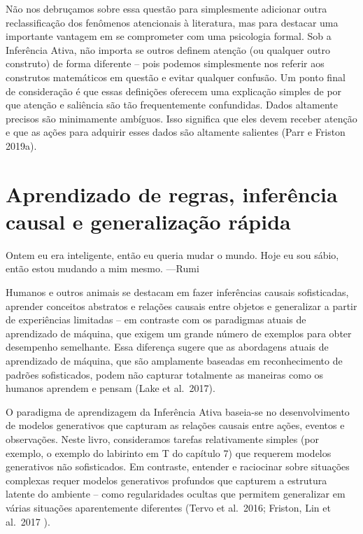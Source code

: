 \documentclass[
  12pt,
]{book}
\begin{document}
Não nos debruçamos sobre essa questão para simplesmente adicionar outra reclassificação dos fenômenos atencionais à literatura, mas para destacar uma importante vantagem em se comprometer com uma psicologia formal. Sob a Inferência Ativa, não importa se outros definem atenção (ou qualquer outro construto) de forma diferente -- pois podemos simplesmente nos referir aos construtos matemáticos em questão e evitar qualquer confusão. Um ponto final de consideração é que essas definições oferecem uma explicação simples de por que atenção e saliência são tão frequentemente confundidas. Dados altamente precisos são minimamente ambíguos. Isso significa que eles devem receber atenção e que as ações para adquirir esses dados são altamente salientes (Parr e Friston 2019a).

\hypertarget{aprendizado-de-regras-inferuxeancia-causal-e-generalizauxe7uxe3o-ruxe1pida}{%
\section{Aprendizado de regras, inferência causal e generalização rápida}\label{aprendizado-de-regras-inferuxeancia-causal-e-generalizauxe7uxe3o-ruxe1pida}}

Ontem eu era inteligente, então eu queria mudar o mundo. Hoje eu sou sábio, então estou mudando a mim mesmo.
---Rumi

Humanos e outros animais se destacam em fazer inferências causais sofisticadas, aprender conceitos abstratos e relações causais entre objetos e generalizar a partir de experiências limitadas -- em contraste com os paradigmas atuais de aprendizado de máquina, que exigem um grande número de exemplos para obter desempenho semelhante. Essa diferença sugere que as abordagens atuais de aprendizado de máquina, que são amplamente baseadas em reconhecimento de padrões sofisticados, podem não capturar totalmente as maneiras como os humanos aprendem e pensam (Lake et al.~2017).

O paradigma de aprendizagem da Inferência Ativa baseia-se no desenvolvimento de modelos generativos que capturam as relações causais entre ações, eventos e observações. Neste livro, consideramos tarefas relativamente simples (por exemplo, o exemplo do labirinto em T do capítulo 7) que requerem modelos generativos não sofisticados. Em contraste, entender e raciocinar sobre situações complexas requer modelos generativos profundos que capturem a estrutura latente do ambiente -- como regularidades ocultas que permitem generalizar em várias situações aparentemente diferentes (Tervo et al.~2016; Friston, Lin et al.~2017 ).
\end{document}
